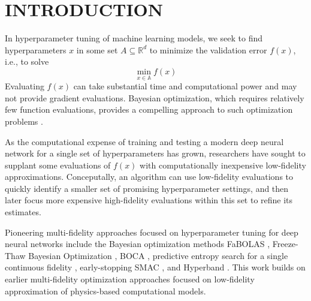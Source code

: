\documentclass[letterpaper]{article}
\numberwithin{equation}{section}
\begin{document}
\section{INTRODUCTION}
In hyperparameter tuning of machine learning models, we seek to find hyperparameters $x$ in some set ${A} \subseteq \mathbb{R}^d$ to minimize the validation error $f(x)$, i.e., to solve
\begin{equation}
\min_{x\in\mathbb{A}} f(x)
\label{eqn:min_f}
\end{equation}
Evaluating $f(x)$ can take substantial time and computational power \citep{bergstra2012random}
and may not provide gradient evaluations. Bayesian optimization, which requires relatively few 
function evaluations, provides a compelling approach to such optimization problems \citep{jones1998efficient, snoek2012practical}.

As the computational expense of training and testing a modern deep neural network for a single set of hyperparameters has grown, researchers have sought to supplant some evaluations of $f(x)$ with computationally inexpensive low-fidelity approximations.  
Conceputally, an algorithm can use low-fidelity evaluations to quickly identify a smaller set of promising hyperparameter settings, and then later focus more expensive high-fidelity evaluations within this set to refine its estimates.

Pioneering multi-fidelity approaches focused on hyperparameter tuning for deep neural networks
include the Bayesian optimization methods FaBOLAS \citep{klein2016fast,klein2015towards}, Freeze-Thaw Bayesian Optimization \citep{swersky2014freeze}, BOCA \citep{kandasamy2017multi}, predictive entropy search for a single continuous fidelity \citep{mcleod2017practical}, early-stopping SMAC \citep{domhan2015speeding}, and
Hyperband \citep{li2016hyperband}.
This work builds on
earlier multi-fidelity optimization approaches \citep{huang2006sequential,lam2015multifidelity,poloczek2016multi} focused on low-fidelity approximation of physics-based computational models.
\end{document}
